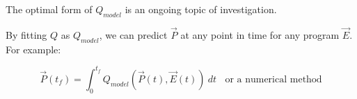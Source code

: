 \documentclass{report}
\begin{document}
\begin{spacing}{0.5}
The optimal form of $Q_{model}$ is an ongoing topic of investigation.

By fitting $Q$ as $Q_{model}$, we can predict $\vec P$ at any point in time for any program $\vec E$. For example:

$$\vec P(t_f)=\int_0^{t_f}Q_{model}(\vec P(t),\vec E(t))~dt~~~~\text{or a numerical method}$$

\end{spacing}

\newpage



\end{document}
